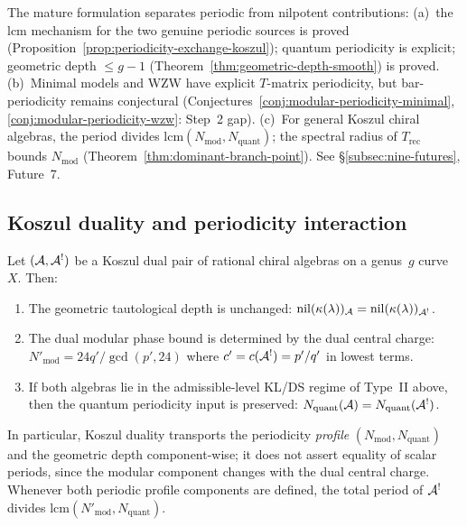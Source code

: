 \begin{remark}\label{rem:stratified-periodicity}
The mature formulation separates periodic from nilpotent contributions:
(a)~the lcm mechanism for the two genuine periodic sources is proved
(Proposition~\ref{prop:periodicity-exchange-koszul}); quantum
periodicity is explicit; geometric depth $\leq g-1$
(Theorem~\ref{thm:geometric-depth-smooth}) is proved.
(b)~Minimal models and WZW have explicit $T$-matrix periodicity,
but bar-periodicity remains conjectural
(Conjectures~\ref{conj:modular-periodicity-minimal},
\ref{conj:modular-periodicity-wzw}: Step~2 gap).
(c)~For general Koszul chiral algebras, the period divides
$\mathrm{lcm}(N_{\mathrm{mod}}, N_{\mathrm{quant}})$; the spectral
radius of $T_{\mathrm{rec}}$ bounds $N_{\mathrm{mod}}$
(Theorem~\ref{thm:dominant-branch-point}).
See \S\ref{subsec:nine-futures}, Future~7.
\end{remark}

\subsection{Koszul duality and periodicity interaction}

\begin{proposition}
\label{prop:periodicity-exchange-koszul}
Let $(\mathcal{A}, \mathcal{A}^!)$ be a Koszul dual pair of rational chiral algebras on a genus~$g$ curve~$X$. Then:
\begin{enumerate}
\item The geometric tautological depth is unchanged:
  $\mathrm{nil}(\kappa(\lambda))_{\mathcal{A}} =
  \mathrm{nil}(\kappa(\lambda))_{\mathcal{A}^!}$.
\item The dual modular phase bound is determined by the dual central
  charge: $N'_{\text{mod}} = 24q'/\gcd(p', 24)$ where
  $c' = c(\mathcal{A}^!) = p'/q'$ in lowest terms.
\item If both algebras lie in the admissible-level KL/DS regime of
  Type~II above, then the quantum periodicity input is preserved:
  $N_{\text{quant}}(\mathcal{A}) = N_{\text{quant}}(\mathcal{A}^!)$.
\end{enumerate}
In particular, Koszul duality transports the periodicity \emph{profile}
$(N_{\text{mod}}, N_{\text{quant}})$ and the geometric depth
component-wise; it
does not assert equality of scalar periods, since the modular component
changes with the dual central charge.  Whenever both periodic profile
components are defined, the total period of $\mathcal{A}^!$ divides
$\mathrm{lcm}(N'_{\text{mod}}, N_{\text{quant}})$.
\end{proposition}

